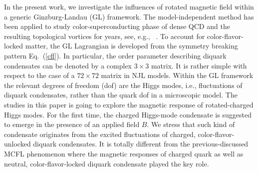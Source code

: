 \documentclass[prd, showpacs,nofootinbib,amsmath,amssymb]{revtex4}
\begin{document}
In the present work, we investigate the influences of rotated magnetic field within a generic Ginzburg-Landau (GL) framework. The model-independent method has been applied to study color-superconducting phase of dense QCD and the resulting 
topological vortices for years, see, e.g., ~\cite{giannakis2002ginzburg,iida2002superfluid,balachandran2006semisuperfluid,nakano2008non,eto2014vortices,zhang2015magnetic}.
To account for color-flavor-locked matter, the GL Lagrangian is developed from the symmetry breaking pattern Eq.~(\ref{cfl}).
In particular, the order parameter describing diquark condensates can be denoted by a complex $3\times3$ matrix. It is rather simple with respect to the case of a $72 \times 72$ matrix in NJL models. Within the GL framework the relevant degrees of freedom (dof) are the Higgs modes, i.e., fluctuations of diquark condensates, rather than the quark dof in a microscopic model.
The studies in this paper is going to explore the magnetic response of rotated-charged Higgs modes. 
For the first time, the charged Higgs-mode condensate is suggested to emerge in the presence of an applied field $B$.
We stress that such kind of condensate originates from the excited fluctuations of 
charged, color-flavor-unlocked diquark condensates. It is totally different from the previous-discussed MCFL phenomenon where the magnetic responses of charged quark as well as neutral, color-flavor-locked diquark condensate played the key role.
\end{document}
